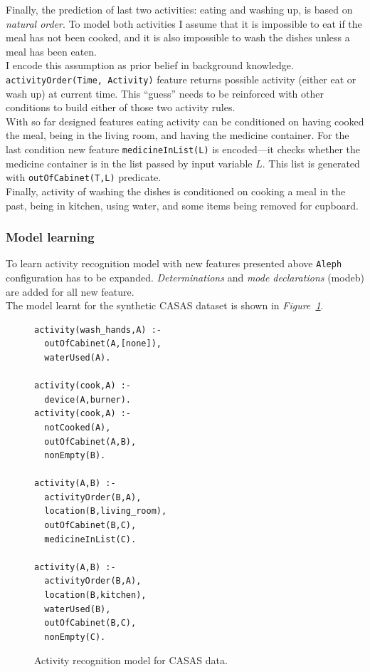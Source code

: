 \documentclass[10pt, a4paper, pdflatex, leqno, twoside, openright]{report}
\begin{document}
Finally, the prediction of last two activities: eating and washing up, is based on \emph{natural order}. To model both activities I assume that it is impossible to eat if the meal has not been cooked, and it is also impossible to wash the dishes unless a meal has been eaten.\\
I encode this assumption as prior belief in background knowledge. \texttt{activityOrder(Time, Activity)} feature returns possible activity (either eat or wash up) at current time. This ``guess'' needs to be reinforced with other conditions to build either of those two activity rules.\\
With so far designed features eating activity can be conditioned on having cooked the meal, being in the living room, and having the medicine container. For the last condition new feature \texttt{medicineInList(L)} is encoded---it checks whether the medicine container is in the list passed by input variable $L$. This list is generated with \texttt{outOfCabinet(T,L)} predicate.\\
Finally, activity of washing the dishes is conditioned on cooking a meal in the past, being in kitchen, using water, and some items being removed for cupboard.

      \subsubsection{Model learning}
To learn activity recognition model with new features presented above \texttt{Aleph} configuration has to be expanded. \emph{Determinations} and \emph{mode declarations} (modeb) are added for all new feature.\\
The model learnt for the synthetic CASAS dataset is shown in \emph{Figure~\ref{lst:CASASmodel}}.

\begin{figure}[htb]
  \begin{verbatim}
activity(wash_hands,A) :-
  outOfCabinet(A,[none]),
  waterUsed(A).

activity(cook,A) :-
  device(A,burner).
activity(cook,A) :-
  notCooked(A),
  outOfCabinet(A,B),
  nonEmpty(B).

activity(A,B) :-
  activityOrder(B,A),
  location(B,living_room),
  outOfCabinet(B,C),
  medicineInList(C).

activity(A,B) :-
  activityOrder(B,A),
  location(B,kitchen),
  waterUsed(B),
  outOfCabinet(B,C),
  nonEmpty(C).
  \end{verbatim}
  \caption{Activity recognition model for CASAS data.\label{lst:CASASmodel}}
\end{figure}
\end{document}
